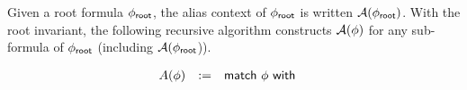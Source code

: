 Given a root formula $\phi_\textsf{root}$, the alias context of $\phi_\textsf{root}$ is written $\mathcal{A}(\phi_\textsf{root})$. With the root invariant, the following recursive algorithm constructs $\mathcal{A}(\phi)$ for any sub-formula of $\phi_\textsf{root}$ (including $\mathcal{A}(\phi_\textsf{root}$)).

\begin{align*}
\begin{array}{rclcl}
A(\phi) &:=& \textsf{match} \ \phi \ \textsf{with} &
\end{array}
\end{align*}
